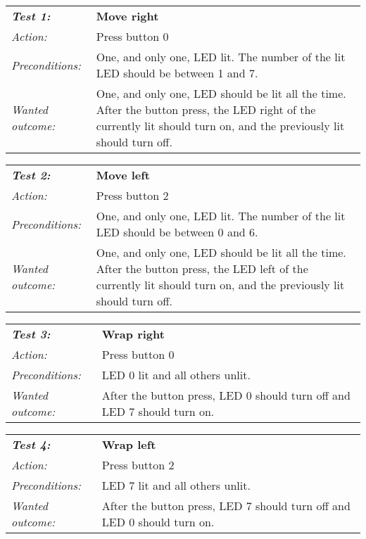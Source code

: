 \begin{tabular}[h]{|lp{12cm}|} \hline
\textbf{\emph{Test 1:}} 		& \textbf{Move right}\\
\emph{Action:} 		& Press button 0\\
\emph{Preconditions:}	& One, and only one, LED lit. The number of the lit LED should be between 1 and 7.\\
\emph{Wanted outcome:}	& One, and only one, LED should be lit all the time. After the button press, the LED right of the currently lit should turn on, and the previously lit should turn off.\\ \hline
\end{tabular}

\vspace{1cm}

\begin{tabular}[h]{|lp{12cm}|} \hline
\textbf{\emph{Test 2:}} 		& \textbf{Move left}\\
\emph{Action:} 		& Press button 2\\
\emph{Preconditions:}	& One, and only one, LED lit. The number of the lit LED should be between 0 and 6.\\
\emph{Wanted outcome:}	& One, and only one, LED should be lit all the time. After the button press, the LED left of the currently lit should turn on, and the previously lit should turn off. \\ \hline
\end{tabular}

\vspace{1cm}

\begin{tabular}[h]{|lp{12cm}|} \hline
\textbf{\emph{Test 3:}} 		& \textbf{Wrap right}\\
\emph{Action:} 		& Press button 0\\
\emph{Preconditions:}	& LED 0 lit and all others unlit.\\
\emph{Wanted outcome:}	& After the button press, LED 0 should turn off and LED 7 should turn on.\\ \hline
\end{tabular}

\vspace{1cm}

\begin{tabular}[h]{|lp{12cm}|} \hline
\textbf{\emph{Test 4:}} 		& \textbf{Wrap left}\\
\emph{Action:} 		& Press button 2\\
\emph{Preconditions:}	& LED 7 lit and all others unlit.\\
\emph{Wanted outcome:}	& After the button press, LED 7 should turn off and LED 0 should turn on.\\ \hline
\end{tabular}

